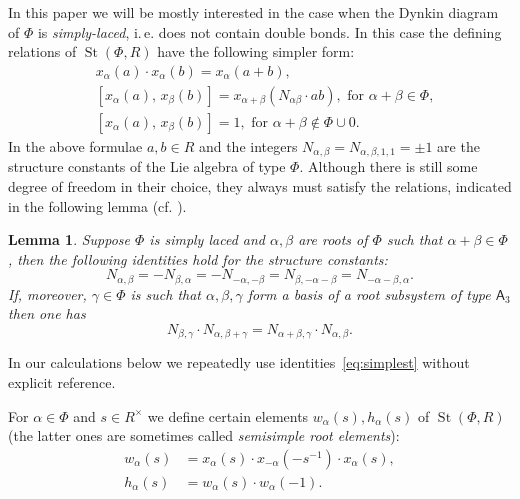 \documentclass[oneside, 8pt]{amsart}
\newtheorem{lemma}{Lemma}
\theoremstyle{remark}
\theoremstyle{definition}
\numberwithin{lemma}{section}
\numberwithin{prop}{section}
\numberwithin{corollary}{section}
\numberwithin{externaltheorem}{section}
\DeclareMathOperator{\St}{St}
\newcommand{\rA}{\mathsf{A}}
\numberwithin{equation}{section}
\begin{document}
In this paper we will be mostly interested in the case when the Dynkin diagram of $\Phi$ is {\it simply-laced}, i.\,e. does not contain double bonds. In this case the defining relations of $\St(\Phi, R)$ have the following simpler form:
\begin{align}
&x_{\alpha}(a)\cdot x_{\alpha}(b)=x_{\alpha}(a+b), \tag{R1} \label{Steinberg-additivity}\\
&[x_{\alpha}(a),\,x_{\beta}(b)]=x_{\alpha+\beta}(N_{\alpha\beta} \cdot ab),\text{ for }\alpha+\beta\in\Phi, \tag{R2} \label{Chevalley-CCF1} \\
&[x_{\alpha}(a),\,x_{\beta}(b)]=1,\text{ for }\alpha+\beta\not\in\Phi\cup0. \tag{R3} \label{Chevalley-CCF2}
\end{align}
In the above formulae $a, b \in R$ and the integers $N_{\alpha, \beta} = N_{\alpha, \beta, 1, 1} = \pm 1$ are the structure constants of the Lie algebra of type $\Phi$. Although there is still some degree of freedom in their choice, they always must satisfy the relations, indicated in the following lemma (cf. \cite[\S~14]{VP}).
\begin{lemma} Suppose $\Phi$ is simply laced and $\alpha, \beta$ are roots of $\Phi$ such that $\alpha+\beta\in \Phi$, then the following identities hold for the structure constants:
\begin{equation} \label{eq:simplest} N_{\alpha, \beta} = -N_{\beta,\alpha} = - N_{-\alpha, -\beta} = N_{\beta, -\alpha-\beta} = N_{-\alpha-\beta, \alpha}. \end{equation}
If, moreover, $\gamma \in \Phi$ is such that $\alpha,\beta,\gamma$ form a basis of a root subsystem of type $\rA_3$ then one has
\begin{equation} \label{eq:cocycle} N_{\beta,\gamma} \cdot N_{\alpha, \beta+\gamma} = N_{\alpha+\beta, \gamma} \cdot N_{\alpha, \beta}. \end{equation} \end{lemma}
In our calculations below we repeatedly use identities~\eqref{eq:simplest} without explicit reference.

For $\alpha\in\Phi$ and $s \in R^\times$ we define certain elements $w_\alpha(s), h_\alpha(s)$ of $\St(\Phi, R)$ (the latter ones are sometimes called {\it semisimple root elements}):
\begin{align*} w_\alpha(s) & =  x_\alpha(s) \cdot x_{-\alpha}(-s^{-1}) \cdot x_\alpha(s), \\ h_\alpha(s) & =  w_\alpha(s) \cdot w_\alpha(-1).  \end{align*}
\end{document}
